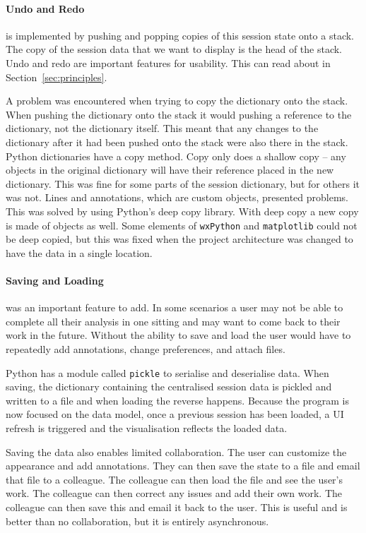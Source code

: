 \paragraph*{Undo and Redo} is implemented by pushing and popping copies of this session state onto a stack.  The copy of the session data that we want to display is the head of the stack.  Undo and redo are important features for usability.  This can read about in Section~\ref{sec:principles}.

A problem was encountered when trying to copy the dictionary onto the stack.  When pushing the dictionary onto the stack it would pushing a reference to the dictionary, not the dictionary itself. This meant that any changes to the dictionary after it had been pushed onto the stack were also there in the stack.  Python dictionaries have a copy method.  Copy only does a shallow copy -- any objects in the original dictionary will have their reference placed in the new dictionary.  This was fine for some parts of the session dictionary, but for others it was not. Lines and annotations, which are custom objects, presented problems.  This was solved by using Python's deep copy library.  With deep copy a new copy is made of objects as well.  Some elements of \texttt{wxPython} and \texttt{matplotlib} could not be deep copied, but this was fixed when the project architecture was changed to have the data in a single location.

\paragraph*{Saving and Loading} was an important feature to add.  In some scenarios a user may not be able to complete all their analysis in one sitting and may want to come back to their work in the future.  Without the ability to save and load the user would have to repeatedly add annotations, change preferences, and attach files.

Python has a module called \texttt{pickle} to serialise and deserialise data.  When saving, the dictionary containing the centralised session data is pickled and written to a file and when loading the reverse happens.  Because the program is now focused on the data model, once a previous session has been loaded, a \ac{UI} refresh is triggered and the visualisation reflects the loaded data.

Saving the data also enables limited collaboration.  The user can customize the appearance and add annotations.  They can then save the state to a file and email that file to a colleague.  The colleague can then load the file and see the user's work.  The colleague can then correct any issues and add their own work.  The colleague can then save this and email it back to the user.  This is useful and is better than no collaboration, but it is entirely asynchronous.

